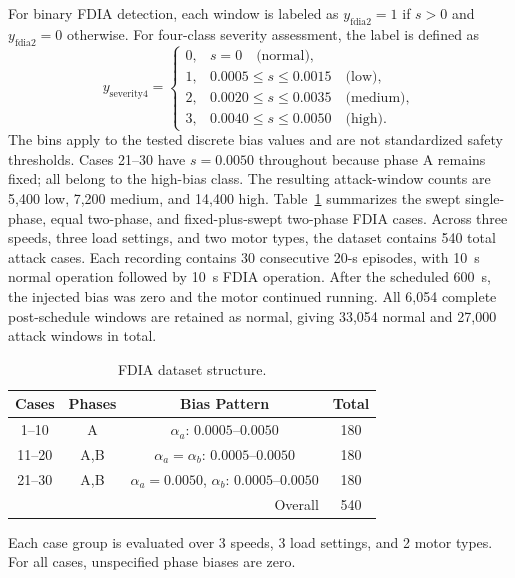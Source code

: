 \documentclass[letterpaper,journal]{IEEEtran}
\begin{document}
For binary FDIA detection, each window is labeled as
$y_{\mathrm{fdia2}}=1$ if $s>0$ and $y_{\mathrm{fdia2}}=0$ otherwise. 
For four-class severity assessment, the label is defined as
\begin{equation}
y_{\mathrm{severity4}} =
\begin{cases}
0, & s=0 \quad \text{(normal)},\\
1, & 0.0005 \leq s \leq 0.0015 \quad \text{(low)},\\
2, & 0.0020 \leq s \leq 0.0035 \quad \text{(medium)},\\
3, & 0.0040 \leq s \leq 0.0050 \quad \text{(high)}.
\end{cases}
\label{eq:severity_bins}
\end{equation}
The bins apply to the tested discrete bias values and are not standardized safety thresholds. Cases 21--30 have $s=0.0050$ throughout because phase A remains fixed; all belong to the high-bias class. The resulting attack-window counts are 5,400 low, 7,200 medium, and 14,400 high.
Table~\ref{tab:cyberattack_dataset_structure} summarizes the swept single-phase, equal two-phase, and fixed-plus-swept two-phase FDIA cases. Across three speeds, three load settings, and two motor types, the dataset contains 540 total attack cases. Each recording contains 30 consecutive 20-s episodes, with 10~s normal operation followed by 10~s FDIA operation. After the scheduled 600~s, the injected bias was zero and the motor continued running. All 6,054 complete post-schedule windows are retained as normal, giving 33,054 normal and 27,000 attack windows in total.

\begin{table}[t]
\centering
\footnotesize
\caption{FDIA dataset structure.}
\label{tab:cyberattack_dataset_structure}
\renewcommand{\arraystretch}{1.12}
\begin{tabular}{c c c c}
\hline
Cases & Phases & Bias Pattern & Total \\
\hline
1--10  & A   & $\alpha_a$: $0.0005$--$0.0050$ & 180 \\
11--20 & A,B & $\alpha_a=\alpha_b$: $0.0005$--$0.0050$ & 180 \\
21--30 & A,B & $\alpha_a=0.0050$, $\alpha_b$: $0.0005$--$0.0050$ & 180 \\
\hline
\multicolumn{3}{r}{Overall} & 540 \\
\hline
\end{tabular}
\vspace{1mm}
\begin{flushleft}
\footnotesize Each case group is evaluated over 3 speeds, 3 load settings, and 2 motor types. For all cases, unspecified phase biases are zero.
\end{flushleft}
\end{table}
\end{document}
